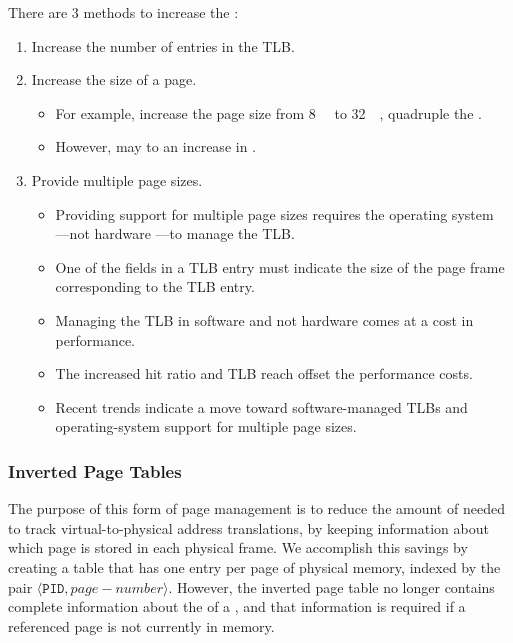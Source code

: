 There are 3 methods to increase the :
\begin{enumerate}[noitemsep]
\item Increase the number of entries in the TLB.\@

\item Increase the size of a page.
  \begin{itemize}[noitemsep]
  \item For example, increase the page size from \SI{8}{\kibi{} \byte{}} to \SI{32}{\kibi{} \byte{}}, quadruple the .
  \item However, may to an increase in .
  \end{itemize}

\item Provide multiple page sizes.
  \begin{itemize}[noitemsep]
  \item Providing support for multiple page sizes requires the operating system
    —not hardware —to manage the TLB.\@
  \item One of the fields in a TLB entry must indicate the size of the page frame corresponding to the TLB entry.
  \item Managing the TLB in software and not hardware comes at a cost in performance.
  \item The increased hit ratio and TLB reach offset the performance costs.
  \item Recent trends indicate a move toward software-managed TLBs and operating-system support for multiple page sizes.
  \end{itemize}
\end{enumerate}

\subsubsection{Inverted Page Tables}\label{subsubsec:Inverted_Page_Tables}
The purpose of this form of page management is to reduce the amount of  needed to track virtual-to-physical address translations, by keeping information about which  page is stored in each physical frame.
We accomplish this savings by creating a table that has one entry per page of physical memory, indexed by the pair $\langle \mathtt{PID}, page-number \rangle$.
However, the inverted page table no longer contains complete information about the  of a , and that information is required if a referenced page is not currently in memory.

